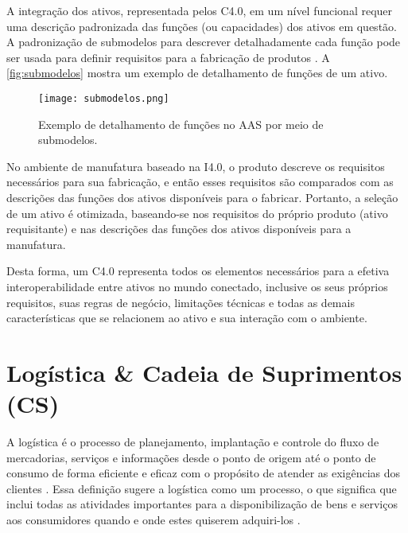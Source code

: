 
A integração dos ativos, representada pelos C4.0, em um nível funcional requer uma descrição padronizada das funções (ou capacidades) dos ativos em questão. A padronização de submodelos para descrever detalhadamente cada função pode ser usada para definir requisitos para a fabricação de produtos \cite{bedenbender2017aasexamples}. A \autoref{fig:submodelos} mostra um exemplo de detalhamento de funções de um ativo.

\begin{figure}[htb]
	\centering
	\texttt{[image: submodelos.png]}
	\caption{Exemplo de detalhamento de funções no AAS por meio de submodelos.}
	\label{fig:submodelos}
\end{figure}

No ambiente de manufatura baseado na I4.0, o produto descreve os requisitos necessários para sua fabricação, e então esses requisitos são comparados com as descrições das funções dos ativos disponíveis para o fabricar. Portanto, a seleção de um ativo é otimizada, baseando-se nos requisitos do próprio produto (ativo requisitante) e nas descrições das funções dos ativos disponíveis para a manufatura.

Desta forma, um C4.0 representa todos os elementos necessários para a efetiva interoperabilidade entre ativos no mundo conectado, inclusive os seus próprios requisitos, suas regras de negócio, limitações técnicas e todas as demais características que se relacionem ao ativo e sua interação com o ambiente.

\section{Logística \& Cadeia de Suprimentos (CS)}
\label{sec:logistica}

A logística é o processo de planejamento, implantação e controle do fluxo de mercadorias, serviços e informações desde o ponto de origem até o ponto de consumo de forma eficiente e eficaz com o propósito de atender as exigências dos clientes \cite{cscmp2013supplychainglossary}. Essa definição sugere a logística como um processo, o que significa que inclui todas as atividades importantes para a disponibilização de bens e serviços aos consumidores quando e onde estes quiserem adquiri-los \cite{ballou2006cadeiasuprimentos}.

